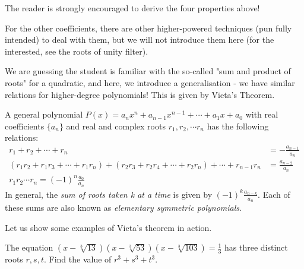 \documentclass[../jarvis.tex]{subfiles}
\begin{document}
The reader is strongly encouraged to derive the four properties above!

For the other coefficients, there are other higher-powered techniques (pun fully intended) to deal with them, but we will not introduce them here (for the interested, see the roots of unity filter).

We are guessing the student is familiar with the so-called "sum and product of roots" for a quadratic, and here, we introduce a generalisation - we have similar relations for higher-degree polynomials! This is given by Vieta's Theorem.

\begin{proposition}
    A general polynomial $P(x)=a_nx^n+a_{n-1}x^{n-1}+\cdots+a_1x+a_0$ with real coefficients $\{a_n\}$ and real and complex roots $r_1, r_2, \cdots r_n$ has the following relations:
    \begin{align*}
        r_1+r_2+\cdots+r_n&=-\frac{a_{n-1}}{a_n}\\
        (r_1r_2+r_1r_3+\cdots+r_1r_n)+(r_2r_3+r_2r_4+\cdots+r_2r_n)+\cdots+r_{n-1}r_n&=\frac{a_{n-2}}{a_n} \\
        r_1r_2\cdots r_n=(-1)^n\frac{a_0}{a_n}
    \end{align*}
    In general, the \textit{sum of roots taken k at a time} is given by $(-1)^k\frac{a_{n-k}}{a_n}.$ Each of these sums are also known as \textit{elementary symmetric polynomials}.
\end{proposition}

Let us show some examples of Vieta's theorem in action. 
\begin{example}
    The equation $(x-\sqrt[3]{13})(x-\sqrt[3]{53})(x-\sqrt[3]{103})=\frac{1}{3}$ has three distinct roots $r,s,t$. Find the value of $r^3+s^3+t^3$.
\end{example}
\end{document}
